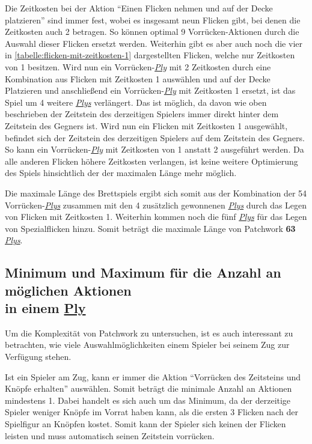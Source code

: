 Die Zeitkosten bei der Aktion \enquote{Einen Flicken nehmen und auf der Decke platzieren} sind immer fest, wobei es insgesamt neun Flicken gibt, bei denen die Zeitkosten auch 2 betragen. So können optimal 9 Vorrücken-Aktionen durch die Auswahl dieser Flicken ersetzt werden. Weiterhin gibt es aber auch noch die vier in \ref{tabelle:flicken-mit-zeitkosten-1} dargestellten Flicken, welche nur Zeitkosten von 1 besitzen. Wird nun ein Vorrücken-\hyperref[text:ply]{\emph{Ply}} mit 2 Zeitkosten durch eine Kombination aus Flicken mit Zeitkosten 1 auswählen und auf der Decke Platzieren und anschließend ein Vorrücken-\hyperref[text:ply]{\emph{Ply}} mit Zeitkosten 1 ersetzt, ist das Spiel um 4 weitere \hyperref[text:ply]{\emph{Plys}} verlängert. Das ist möglich, da davon wie oben beschrieben der Zeitstein des derzeitigen Spielers immer direkt hinter dem Zeitstein des Gegners ist. Wird nun ein Flicken mit Zeitkosten 1 ausgewählt, befindet sich der Zeitstein des derzeitigen Spielers auf dem Zeitstein des Gegners. So kann ein Vorrücken-\hyperref[text:ply]{\emph{Ply}} mit Zeitkosten von 1 anstatt 2 ausgeführt werden. Da alle anderen Flicken höhere Zeitkosten verlangen, ist keine weitere Optimierung des Spiels hinsichtlich der der maximalen Länge mehr möglich.

Die maximale Länge des Brettspiels ergibt sich somit aus der Kombination der 54 Vorrücken-\hyperref[text:ply]{\emph{Plys}} zusammen mit den 4 zusätzlich gewonnenen \hyperref[text:ply]{\emph{Plys}} durch das Legen von Flicken mit Zeitkosten 1. Weiterhin kommen noch die fünf \hyperref[text:ply]{\emph{Plys}} für das Legen von Spezialflicken hinzu. Somit beträgt die maximale Länge von Patchwork \textbf{63} \hyperref[text:ply]{\emph{Plys}}.

\subsection*{Minimum und Maximum für die Anzahl an möglichen Aktionen \\ in einem \hyperref[text:ply]{Ply}}

Um die Komplexität von Patchwork zu untersuchen, ist es auch interessant zu betrachten, wie viele Auswahlmöglichkeiten einem Spieler bei seinem Zug zur Verfügung stehen.

Ist ein Spieler am Zug, kann er immer die Aktion \enquote{Vorrücken des Zeitsteins und Knöpfe erhalten} auswählen. Somit beträgt die minimale Anzahl an Aktionen mindestens 1. Dabei handelt es sich auch um das Minimum, da der derzeitige Spieler weniger Knöpfe im Vorrat haben kann, als die ersten 3 Flicken nach der Spielfigur an Knöpfen kostet. Somit kann der Spieler sich keinen der Flicken leisten und muss automatisch seinen Zeitstein vorrücken.

